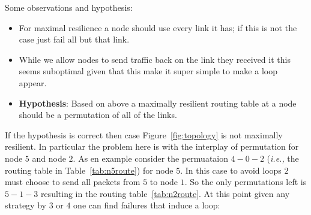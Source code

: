 \documentclass[letterpaper, 10pt]{article}
\newcommand{\ie}{{\it i.e.,}\xspace}
\begin{document}
Some observations and hypothesis:
\begin{itemize}
    \item For maximal resilience a node should use every link it has; if this is not the case just fail all but that
        link.
    \item While we allow nodes to send traffic back on the link they received it this seems suboptimal given that this
        make it super simple to make a loop appear.
    \item \textbf{Hypothesis}: Based on above a maximally resilient routing table at a node should be a permutation of all of the links.
\end{itemize}

\begin{figure}[h]
\hspace{0.2in}
\end{figure}

If the hypothesis is correct then case Figure~\ref{fig:topology} is not maximally resilient. In particular the problem
here is with the interplay of permutation for node $5$ and node $2$. As en example consider the permuataion  $4-0-2$ 
(\ie the routing table in Table~\ref{tab:n5route}) for node $5$. In this case to avoid loops $2$ must choose to send all
packets from $5$ to node $1$. So the only permutations left is $5-1-3$ resulting in the routing table~\ref{tab:n2route}.
At this point given any strategy by $3$ or $4$ one can find failures that induce a loop: 
\end{document}
